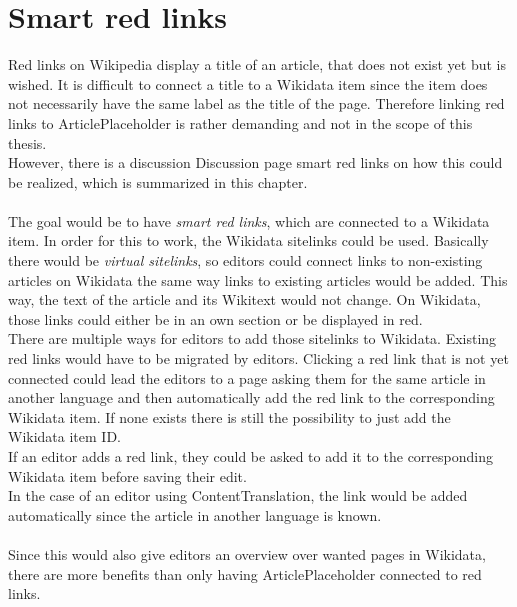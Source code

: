 \section{Smart red links}\label{sec:redLinks}
	Red links on Wikipedia display a title of an article, that does not exist yet but is wished. It is difficult to connect a title to a Wikidata item since the item does not necessarily have the same label as the title of the page. Therefore linking red links to ArticlePlaceholder is rather demanding and not in the scope of this thesis. \\
	However, there is a discussion Discussion page smart red links on how this could be realized, which is summarized in this chapter. \citep{wiki:22} \\
	\\
	The goal would be to have \textit{smart red links}, which are connected to a Wikidata item. In order for this to work, the Wikidata sitelinks could be used. Basically there would be \textit{virtual sitelinks}, so editors could connect links to non-existing articles on Wikidata the same way links to existing articles would be added. This way, the text of the article and its Wikitext would not change. On Wikidata, those links could either be in an own section or be displayed in red. \\
	There are multiple ways for editors to add those sitelinks to Wikidata. Existing red links would have to be migrated by editors. Clicking a red link that is not yet connected could lead the editors to a page asking them for the same article in another language and then automatically add the red link to the corresponding Wikidata item. If none exists there is still the possibility to just add the Wikidata item ID. \\
	If an editor adds a red link, they could be asked to add it to the corresponding Wikidata item before saving their edit. \\
	In the case of an editor using ContentTranslation, the link would be added automatically since the article in another language is known. \\
	\\
	Since this would also give editors an overview over wanted pages in Wikidata, there are more benefits than only having ArticlePlaceholder connected to red links.